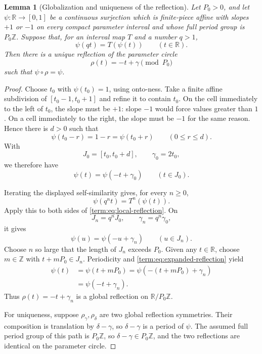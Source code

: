 \documentclass[11pt]{article}
\newtheorem{lemma}[theorem]{Lemma}
\theoremstyle{definition}
\theoremstyle{remark}
\newcommand{\I}{[0,1]}
\begin{document}
\begin{lemma}[Globalization and uniqueness of the reflection]
\label{term:lem:global-reflection}
Let \(P_0>0\), and let \(\psi:\mathbb R\to\I\) be a continuous surjection
which is finite-piece affine with slopes \(+1\) or \(-1\) on every compact
parameter interval and whose full period group is \(P_0\mathbb Z\).  Suppose
that, for an interval map \(T\) and a number \(q>1\),
\[
 \psi(qt)=T(\psi(t))\qquad(t\in\mathbb R).
\]
Then there is a unique reflection of the parameter circle
\[
 \rho(t)=-t+\gamma\pmod{P_0}
\]
such that \(\psi\circ\rho=\psi\).
\end{lemma}

\begin{proof}
Choose \(t_0\) with \(\psi(t_0)=1\), using onto-ness.  Take a finite affine
subdivision of \([t_0-1,t_0+1]\) and refine it to contain \(t_0\).  On the
cell immediately to the left of \(t_0\), the slope must be
\(+1\): slope \(-1\) would force values greater than \(1\).  On a
cell immediately to the right, the slope must
be \(-1\) for the same reason.  Hence there is \(d>0\) such that
\[
 \psi(t_0-r)=1-r=\psi(t_0+r)
 \qquad(0\leq r\leq d).
\]
With
\[
 J_0=[t_0,t_0+d],\qquad \gamma_0=2t_0,
\]
we therefore have
\begin{equation}\label{term:eq:local-reflection}
 \psi(t)=\psi(-t+\gamma_0)\qquad(t\in J_0).
\end{equation}

Iterating the displayed self-similarity gives, for every
\(n\geq0\),
\[
 \psi(q^nt)=T^n(\psi(t)).
\]
Apply this to both sides of \eqref{term:eq:local-reflection}.  On
\[
 J_n=q^nJ_0,\qquad
 \gamma_n=q^n\gamma_0,
\]
it gives
\begin{equation}\label{term:eq:expanded-reflection}
 \psi(u)=\psi(-u+\gamma_n)\qquad(u\in J_n).
\end{equation}
Choose \(n\) so large that the length of \(J_n\) exceeds \(P_0\).  Given any
\(t\in\mathbb R\), choose \(m\in\mathbb Z\) with \(t+mP_0\in J_n\).
Periodicity and \eqref{term:eq:expanded-reflection} yield
\[
\begin{split}
 \psi(t)
 &=\psi(t+mP_0)
 =\psi(-(t+mP_0)+\gamma_n)\\
 &=\psi(-t+\gamma_n).
\end{split}
\]
Thus \(\rho(t)=-t+\gamma_n\) is a global reflection on
\(\mathbb R/P_0\mathbb Z\).

For uniqueness, suppose \(\rho_\gamma,\rho_\delta\) are two global reflection
symmetries.  Their composition is translation by \(\delta-\gamma\), so
\(\delta-\gamma\) is a period of \(\psi\).  The assumed full period group of
this path is \(P_0\mathbb Z\), so \(\delta-\gamma\in P_0\mathbb Z\), and the two
reflections are identical on the parameter circle.
\end{proof}
\end{document}
